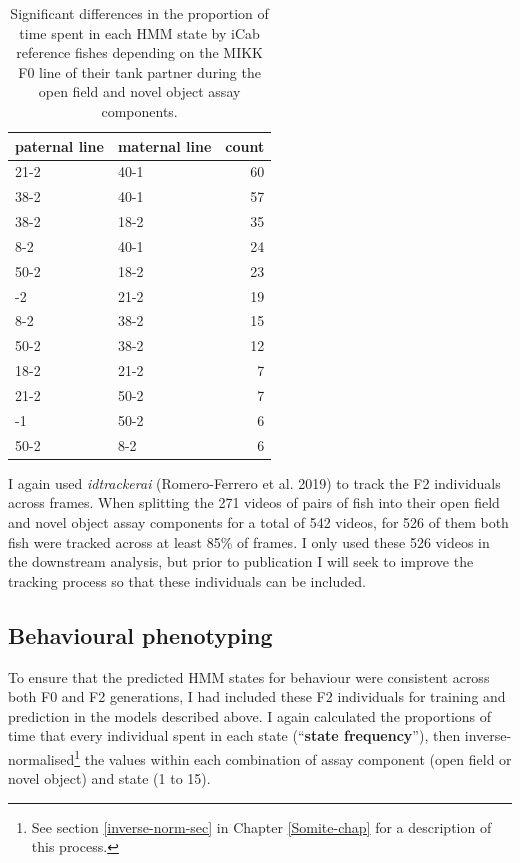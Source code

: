 \documentclass[
]{book}
\begin{document}
\begin{table}

\caption{\label{tab:F2-cross-counts}Significant differences in the proportion of time spent in each HMM state by iCab reference fishes depending on the MIKK F0 line of their tank partner during the open field and novel object assay components.}
\centering
\begin{tabular}[t]{llr}
\toprule
paternal line & maternal line & count\\
\midrule
21-2 & 40-1 & 60\\
38-2 & 40-1 & 57\\
38-2 & 18-2 & 35\\
8-2 & 40-1 & 24\\
50-2 & 18-2 & 23\\
\addlinespace
38-2 & 21-2 & 19\\
8-2 & 38-2 & 15\\
50-2 & 38-2 & 12\\
18-2 & 21-2 & 7\\
21-2 & 50-2 & 7\\
\addlinespace
40-1 & 50-2 & 6\\
50-2 & 8-2 & 6\\
\bottomrule
\end{tabular}
\end{table}

I again used \emph{idtrackerai} (Romero-Ferrero et al. 2019) to track the F2 individuals across frames. When splitting the 271 videos of pairs of fish into their open field and novel object assay components for a total of 542 videos, for 526 of them both fish were tracked across at least 85\% of frames. I only used these 526 videos in the downstream analysis, but prior to publication I will seek to improve the tracking process so that these individuals can be included.

\hypertarget{behavioural-phenotyping}{%
\subsection{Behavioural phenotyping}\label{behavioural-phenotyping}}

To ensure that the predicted HMM states for behaviour were consistent across both F0 and F2 generations, I had included these F2 individuals for training and prediction in the models described above. I again calculated the proportions of time that every individual spent in each state (``\textbf{state frequency}''), then inverse-normalised\footnote{See section \ref{inverse-norm-sec} in Chapter \ref{Somite-chap} for a description of this process.} the values within each combination of assay component (open field or novel object) and state (1 to 15).
\end{document}
